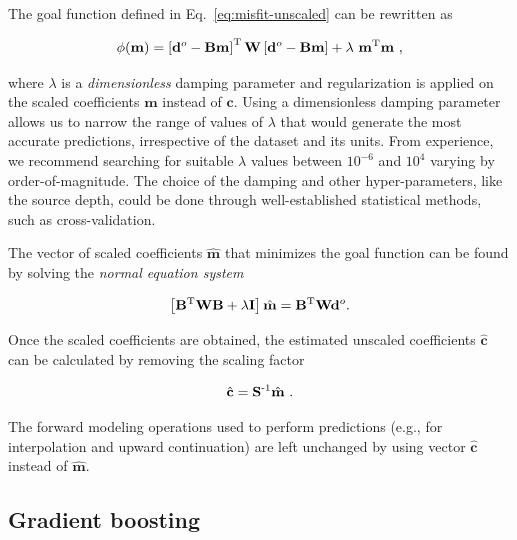 The goal function defined in Eq.~\ref{eq:misfit-unscaled} can be
rewritten as

\begin{equation}
    \phi(\mathbf{m}) =
    \left[\mathbf{d}^o - \mathbf{B}\mathbf{m}\right]^{\text{T}}
    \mathbf{W}
    \left[\mathbf{d}^o - \mathbf{B}\mathbf{m}\right]
    + \lambda\ \mathbf{m}^{\text{T}}\mathbf{m}
    \ ,
    \label{eq:misfit}
\end{equation}

\noindent where $\lambda$ is a \emph{dimensionless} damping parameter and
regularization is applied on the scaled coefficients $\mathbf{m}$ instead of
$\mathbf{c}$.
Using a dimensionless damping parameter allows us to narrow the range of values
of $\lambda$ that would generate the most accurate predictions, irrespective
of the dataset and its units.
From experience, we recommend searching for suitable $\lambda$ values between
$10^{-6}$ and $10^{4}$ varying by order-of-magnitude.
The choice of the damping and other hyper-parameters, like the source depth,
could be done through well-established statistical methods, such as
cross-validation.

The vector of scaled coefficients $\hat{\mathbf{m}}$ that minimizes the goal
function can be found by solving the \emph{normal equation system}
\citep{menke1989}

\begin{equation}
    \left[
      \mathbf{B}^{\text{T}} \mathbf{W} \mathbf{B} + \lambda \mathbf{I}
    \right]
    \hat{\mathbf{m}} =
    \mathbf{B}^{\text{T}}\mathbf{W}
    \mathbf{d}^o.
    \label{eq:least_squares_solution}
\end{equation}

Once the scaled coefficients are obtained, the estimated unscaled coefficients
$\hat{\mathbf{c}}$ can be calculated by removing the scaling factor

\begin{equation}
    \hat{\mathbf{c}} = \mathbf{S}^{\text{-}1} \hat{\mathbf{m}} \ .
\end{equation}

\noindent The forward modeling operations used to perform predictions
(e.g., for interpolation and upward continuation) are left unchanged by
using vector $\hat{\mathbf{c}}$ instead of $\hat{\mathbf{m}}$.


\subsection{Gradient boosting}

